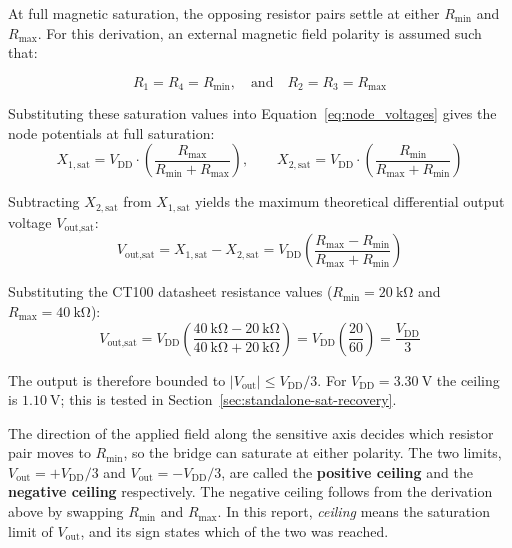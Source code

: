 \documentclass[12pt,a4paper]{article}
\begin{document}
 At full magnetic saturation, the opposing resistor pairs settle at either $R_{\min}$ and $R_{\max}$. For this derivation, an external magnetic field polarity is assumed such that:

\begin{equation}
R_1 = R_4 = R_{\min}, \quad \text{and} \quad R_2 = R_3 = R_{\max}
\label{eq:tmr-saturation-resistances}
\end{equation}

Substituting these saturation values into Equation~\ref{eq:node_voltages} gives the node potentials at full saturation:
\begin{equation}
    X_{1,\text{sat}} = V_{\text{DD}} \cdot \left( \frac{R_{\max}}{R_{\min} + R_{\max}} \right), \qquad X_{2,\text{sat}} = V_{\text{DD}} \cdot \left( \frac{R_{\min}}{R_{\max} + R_{\min}} \right)
\end{equation}

Subtracting $X_{2,\text{sat}}$ from $X_{1,\text{sat}}$ yields the maximum theoretical differential output voltage $V_{\text{out,sat}}$:
\begin{equation}
    V_{\text{out,sat}} = X_{1,\text{sat}} - X_{2,\text{sat}} = V_{\text{DD}} \left( \frac{R_{\max} - R_{\min}}{R_{\max} + R_{\min}} \right)
    \label{eq:vout_sat_derived}
\end{equation}

Substituting the CT100 datasheet resistance values \cite{ct100_datasheet} ($R_{\min} = \SI{20}{\kilo\ohm}$ and $R_{\max} = \SI{40}{\kilo\ohm}$):
\begin{equation}
    V_{\text{out,sat}} = V_{\text{DD}} \left( \frac{\SI{40}{\kilo\ohm} - \SI{20}{\kilo\ohm}}{\SI{40}{\kilo\ohm} + \SI{20}{\kilo\ohm}} \right) = V_{\text{DD}} \left( \frac{20}{60} \right) = \frac{V_{\text{DD}}}{3}
\end{equation}

The output is therefore bounded to $\left| V_{\text{out}} \right| \le V_{\text{DD}}/3$. For $V_{\text{DD}} = \SI{3.30}{\volt}$ the ceiling is $\SI{1.10}{\volt}$; this is tested in Section~\ref{sec:standalone-sat-recovery}.

The direction of the applied field along the sensitive axis decides which resistor pair moves to $R_{\min}$, so the bridge can saturate at either polarity. The two limits, $V_{\text{out}} = +V_{\text{DD}}/3$ and $V_{\text{out}} = -V_{\text{DD}}/3$, are called the \textbf{positive ceiling} and the \textbf{negative ceiling} respectively. The negative ceiling follows from the derivation above by swapping $R_{\min}$ and $R_{\max}$. In this report, \emph{ceiling} means the saturation limit of $V_{\text{out}}$, and its sign states which of the two was reached.
\end{document}
